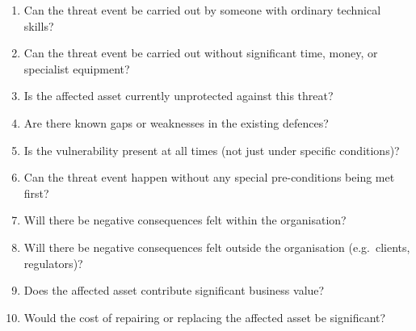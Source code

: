 \begin{enumerate}
\item Can the threat event be carried out by someone with ordinary technical skills?
\item Can the threat event be carried out without significant time, money, or specialist equipment?
\item Is the affected asset currently unprotected against this threat?
\item Are there known gaps or weaknesses in the existing defences?
\item Is the vulnerability present at all times (not just under specific conditions)?
\item Can the threat event happen without any special pre-conditions being met first?
\item Will there be negative consequences felt within the organisation?
\item Will there be negative consequences felt outside the organisation (e.g.\ clients, regulators)?
\item Does the affected asset contribute significant business value?
\item Would the cost of repairing or replacing the affected asset be significant?
\end{enumerate}
